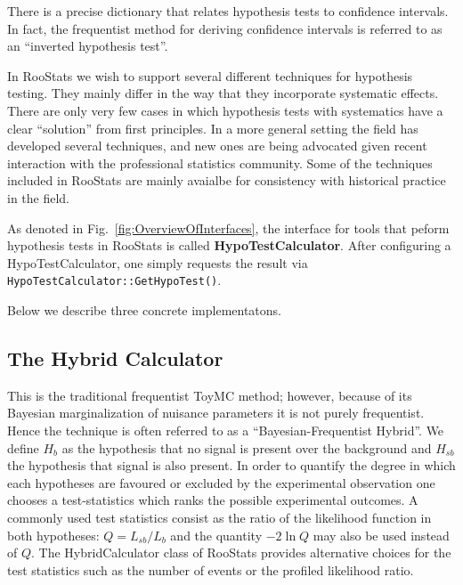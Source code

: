 \documentclass[11pt]{article}
\begin{document}
There is a precise dictionary that relates hypothesis tests to confidence intervals.  In fact, the frequentist method for deriving confidence intervals is referred to as an ``inverted hypothesis test''.

In RooStats we wish to support several different techniques for hypothesis testing.  They mainly differ in the way that they incorporate systematic effects.  There are only very few cases in which hypothesis tests with systematics have a clear ``solution'' from first principles.  In a more general setting the field has developed several techniques, and new ones are being advocated given recent interaction with the professional statistics community.  Some of the techniques included in RooStats are mainly avaialbe for consistency with historical practice in the field.

As denoted in Fig.~\ref{fig:OverviewOfInterfaces}, the interface for tools that peform hypothesis tests in RooStats is called \textbf{HypoTestCalculator}.  After configuring a HypoTestCalculator, one simply requests the result via \texttt{HypoTestCalculator::GetHypoTest()}.

Below we describe three concrete implementatons.


\subsection{The Hybrid Calculator}

This is the traditional frequentist ToyMC method; however, because of
its Bayesian marginalization of nuisance parameters it is not purely
frequentist.  Hence the technique is often referred to as a
``Bayesian-Frequentist Hybrid''.
 We define $H_b$ as the hypothesis that no signal is
present over the background and $H_{sb}$ the hypothesis that signal is
also present. In order to quantify the degree in which each hypotheses
are favoured or excluded by the experimental observation one chooses a
test-statistics which ranks the possible experimental outcomes. A
commonly used test statistics consist as the ratio of the likelihood
function in both hypotheses: $Q=L_{sb}/L_b$ and the quantity $-2\ln Q$
may also be used instead of $Q$. The HybridCalculator class of RooStats provides alternative
choices for the test statistics such as the number of events or the
profiled likelihood ratio.
\end{document}
